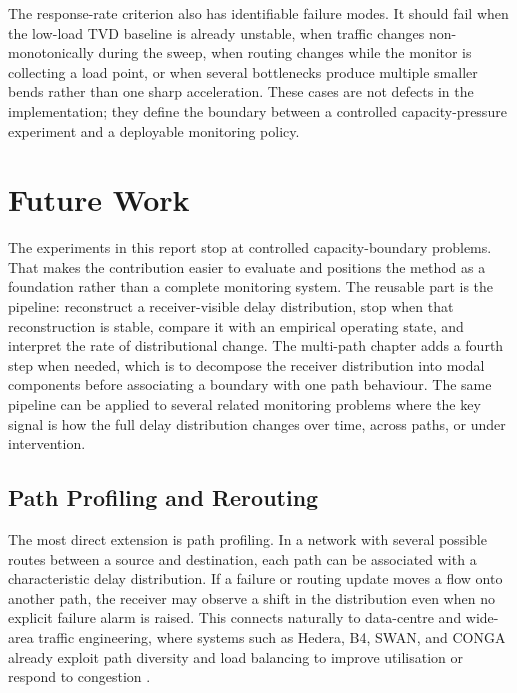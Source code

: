 \documentclass[a4paper,11pt]{report}
\begin{document}
The response-rate criterion also has identifiable failure modes. It should fail when the low-load TVD baseline is already unstable, when traffic changes non-monotonically during the sweep, when routing changes while the monitor is collecting a load point, or when several bottlenecks produce multiple smaller bends rather than one sharp acceleration. These cases are not defects in the implementation; they define the boundary between a controlled capacity-pressure experiment and a deployable monitoring policy.

\chapter{Future Work}

The experiments in this report stop at controlled capacity-boundary problems. That makes the contribution easier to evaluate and positions the method as a foundation rather than a complete monitoring system. The reusable part is the pipeline: reconstruct a receiver-visible delay distribution, stop when that reconstruction is stable, compare it with an empirical operating state, and interpret the rate of distributional change. The multi-path chapter adds a fourth step when needed, which is to decompose the receiver distribution into modal components before associating a boundary with one path behaviour. The same pipeline can be applied to several related monitoring problems where the key signal is how the full delay distribution changes over time, across paths, or under intervention.

\section{Path Profiling and Rerouting}

The most direct extension is path profiling. In a network with several possible routes between a source and destination, each path can be associated with a characteristic delay distribution. If a failure or routing update moves a flow onto another path, the receiver may observe a shift in the distribution even when no explicit failure alarm is raised. This connects naturally to data-centre and wide-area traffic engineering, where systems such as Hedera, B4, SWAN, and CONGA already exploit path diversity and load balancing to improve utilisation or respond to congestion \cite{alFaresHedera,jainB4,hongSwan,alizadehConga}.
\end{document}
